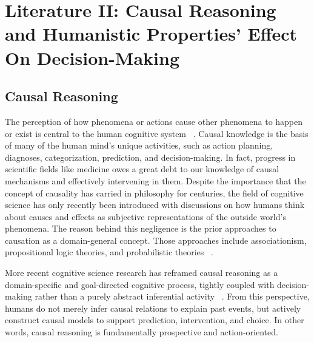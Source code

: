 \documentclass{sfuthesis}
\begin{document}
\chapter{Literature II: Causal Reasoning and Humanistic Properties’ Effect On Decision-Making}
\section{Causal Reasoning}
The perception of how phenomena or actions cause other phenomena to happen or exist is central to the human cognitive system ~\cite{sloman_causality_2015}. Causal knowledge is the basis of many of the human mind's unique activities, such as action planning, diagnoses, categorization, prediction, and decision-making. In fact, progress in scientific fields like medicine owes a great debt to our knowledge of causal mechanisms and effectively intervening in them. Despite the importance that the concept of causality has carried in philosophy for centuries, the field of cognitive science has only recently been introduced with discussions on how humans think about causes and effects as subjective representations of the outside world’s phenomena. The reason behind this negligence is the prior approaches to causation as a domain-general concept. Those approaches include associationism, propositional logic theories, and probabilistic theories ~\cite{waldmann_causal_2013}.\par
More recent cognitive science research has reframed causal reasoning as a domain-specific and goal-directed cognitive process, tightly coupled with decision-making rather than a purely abstract inferential activity ~\cite{waldmann_causal_2013}. From this perspective, humans do not merely infer causal relations to explain past events, but actively construct causal models to support prediction, intervention, and choice. In other words, causal reasoning is fundamentally prospective and action-oriented.
\end{document}
